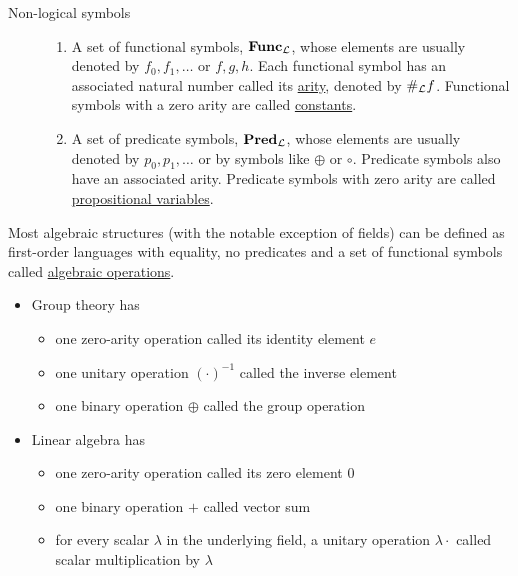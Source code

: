 \begin{definition}
\begin{description}
    \item[Non-logical symbols]
    \mbox{}
    \begin{enumerate}
      \item A set of functional symbols, $\operatorname{\mathbf{Func}}_{\mathcal L}$, whose elements are usually denoted by $f_0, f_1, \ldots$ or $f, g, h$. Each functional symbol has an associated natural number called its \ul{arity}, denoted by $\#_{\mathcal L} f$. Functional symbols with a zero arity are called \ul{constants}.

      \item A set of predicate symbols, $\operatorname{\mathbf{Pred}}_{\mathcal L}$, whose elements are usually denoted by $p_0, p_1, \ldots$ or by symbols like $\oplus$ or $\circ$. Predicate symbols also have an associated arity. Predicate symbols with zero arity are called \ul{propositional variables}.
    \end{enumerate}
  \end{description}
\end{definition}

\begin{example}\label{ex:algebraic_theory_language}\cite[remark 2.1.4]{Leinster2014}
  Most algebraic structures (with the notable exception of fields) can be defined as first-order languages with equality, no predicates and a set of functional symbols called \ul{algebraic operations}.
  \begin{itemize}
    \item Group theory has
    \begin{itemize}
      \item one zero-arity operation called its identity element $e$
      \item one unitary operation $(\cdot)^{-1}$ called the inverse element
      \item one binary operation $\oplus$ called the group operation
    \end{itemize}

    \item Linear algebra has
    \begin{itemize}
      \item one zero-arity operation called its zero element $0$
      \item one binary operation $+$ called vector sum
      \item for every scalar $\lambda$ in the underlying field, a unitary operation $\lambda \cdot$ called scalar multiplication by $\lambda$
    \end{itemize}
  \end{itemize}
\end{example}

